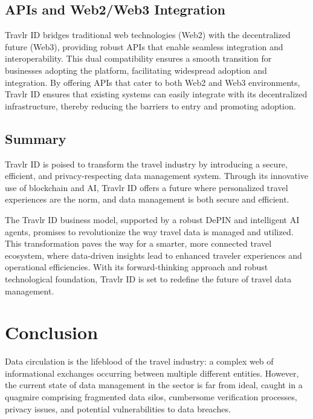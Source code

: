 \documentclass{article}
\begin{document}
\subsection{APIs and Web2/Web3 Integration}

Travlr ID bridges traditional web technologies (Web2) with the decentralized future (Web3), providing robust APIs that enable seamless integration and interoperability. This dual compatibility ensures a smooth transition for businesses adopting the platform, facilitating widespread adoption and integration. By offering APIs that cater to both Web2 and Web3 environments, Travlr ID ensures that existing systems can easily integrate with its decentralized infrastructure, thereby reducing the barriers to entry and promoting adoption.

\subsection{Summary}

Travlr ID is poised to transform the travel industry by introducing a secure, efficient, and privacy-respecting data management system. Through its innovative use of blockchain and AI, Travlr ID offers a future where personalized travel experiences are the norm, and data management is both secure and efficient. 

The Travlr ID business model, supported by a robust DePIN and intelligent AI agents, promises to revolutionize the way travel data is managed and utilized. This transformation paves the way for a smarter, more connected travel ecosystem, where data-driven insights lead to enhanced traveler experiences and operational efficiencies. With its forward-thinking approach and robust technological foundation, Travlr ID is set to redefine the future of travel data management.

\newpage

\section{Conclusion}

Data circulation is the lifeblood of the travel industry: a complex web of informational exchanges occurring between multiple different entities. However, the current state of data management in the sector is far from ideal, caught in a quagmire comprising fragmented data silos, cumbersome verification processes, privacy issues, and potential vulnerabilities to data breaches. 
\end{document}
